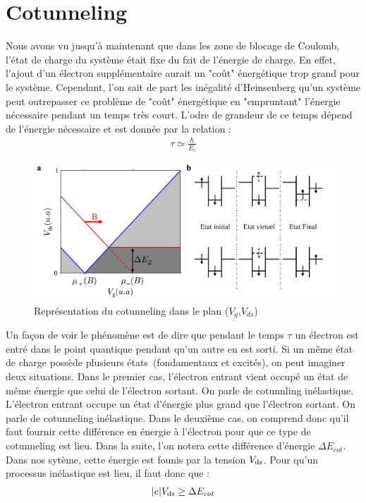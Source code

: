 \section{Cotunneling}
Nous avons vu jusqu'à maintenant que dans les zone de blocage de Coulomb, l'état de charge du système était fixe du fzit de l'énergie de charge. En effet, l'ajout d'un électron supplémentaire aurait un "co\^ut" énergétique trop grand pour le système. Cependant, l'on sait de part les inégalité d'Heinsenberg qu'un système peut outrepasser ce problème de "co\^ut" énergétique en "empruntant" l'énergie nécessaire pendant un temps très court. L'odre de grandeur de ce temps dépend de l'énergie nécessaire et est donnée par la relation :
\begin{eqnarray}
\tau \simeq \frac{\hbar}{E_c} \nonumber
\end{eqnarray}


\begin{figure}
\includegraphics[scale=0.5]{Theorie/Transport/figure5/figure5.pdf} 
\caption{Représentation du cotunneling dans le plan ($V_g$,$V_{ds}$)}
\label{charge_discharge}
\end{figure}


Un façon de voir le phénomène est de dire que pendant le temps $\tau$ un électron est entré dans le point quantique pendant qu'un autre en est sorti. Si un m\^eme état de charge possède plusieurs états~(fondamentaux et excités), on peut imaginer deux situations. Dans le premier cas, l'électron entrant vient occupé un état de m\^eme énergie que celui de l'électron sortant. On parle de cotunnling inélastique. L'électron entrant occupe un état d'énergie plus grand que l'électron sortant. On parle de cotunneling inélastique. Dans le deuxième cas, on comprend donc qu'il faut fournir cette différence en énergie à l'électron pour que ce type de cotunneling est lieu. Dans la suite, l'on notera cette différence d'énergie $\Delta E_{cot}$. Dans nos sytème, cette énergie est founis par la tension $V_{\rm{ds}}$. Pour qu'un processus inélastique est lieu, il faut donc que :
\begin{eqnarray}
|e|V_{\rm{ds}} \geq \Delta E_{cot}
\end{eqnarray}

